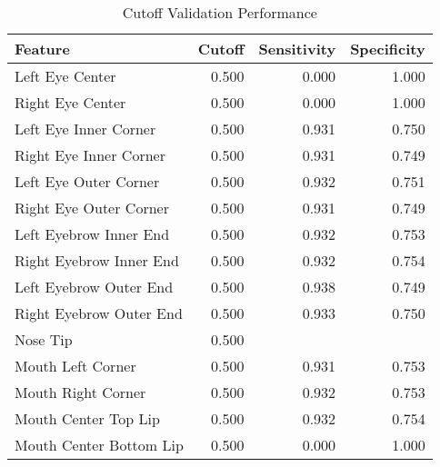 \begin{table}[ht]
\centering
\caption{Cutoff Validation Performance} 
\label{tab:logistic_cutoff_table}
\begin{tabular}{lrrr}
  \hline
Feature & Cutoff & Sensitivity & Specificity \\ 
  \hline
Left Eye Center & 0.500 & 0.000 & 1.000 \\ 
  Right Eye Center & 0.500 & 0.000 & 1.000 \\ 
  Left Eye Inner Corner & 0.500 & 0.931 & 0.750 \\ 
  Right Eye Inner Corner & 0.500 & 0.931 & 0.749 \\ 
  Left Eye Outer Corner & 0.500 & 0.932 & 0.751 \\ 
  Right Eye Outer Corner & 0.500 & 0.931 & 0.749 \\ 
  Left Eyebrow Inner End & 0.500 & 0.932 & 0.753 \\ 
  Right Eyebrow Inner End & 0.500 & 0.932 & 0.754 \\ 
  Left Eyebrow Outer End & 0.500 & 0.938 & 0.749 \\ 
  Right Eyebrow Outer End & 0.500 & 0.933 & 0.750 \\ 
  Nose Tip & 0.500 &  &  \\ 
  Mouth Left Corner & 0.500 & 0.931 & 0.753 \\ 
  Mouth Right Corner & 0.500 & 0.932 & 0.753 \\ 
  Mouth Center Top Lip & 0.500 & 0.932 & 0.754 \\ 
  Mouth Center Bottom Lip & 0.500 & 0.000 & 1.000 \\ 
   \hline
\end{tabular}
\end{table}
